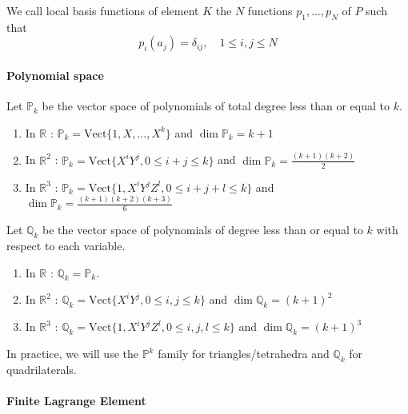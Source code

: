 \begin{Rem}
	We call local basis functions of element $K$ the $N$ functions $p_1,\dots,p_N$ of $P$ such that
	\begin{equation*}
		p_i(a_j)=\delta_{ij},\quad 1\le i,j\le N
	\end{equation*}
\end{Rem}

\paragraph{Polynomial space}

Let $\mathbb{P}_k$ be the vector space of polynomials of total degree less than or equal to $k$.

\begin{enumerate}[label=\textbullet]
	\item In $\mathbb{R}$ : $\mathbb{P}_k=\text{Vect}\{1,X,\dots,X^k\}$ and $\dim\mathbb{P}_k=k+1$ 
	\item In $\mathbb{R}^2$ : $\mathbb{P}_k=\text{Vect}\{X^iY^j,0\le i+j\le k\}$ and $\dim\mathbb{P}_k=\frac{(k+1)(k+2)}{2}$
	\item In $\mathbb{R}^3$ : $\mathbb{P}_k=\text{Vect}\{1,X^iY^jZ^l,0\le i+j+l\le k\}$ and $\dim\mathbb{P}_k=\frac{(k+1)(k+2)(k+3)}{6}$
\end{enumerate}

Let $\mathbb{Q}_k$ be the vector space of polynomials of degree less than or equal to $k$ with respect to each variable.

\begin{enumerate}[label=\textbullet]
	\item In $\mathbb{R}$ : $\mathbb{Q}_k=\mathbb{P}_k$. 
	\item In $\mathbb{R}^2$ : $\mathbb{Q}_k=\text{Vect}\{X^iY^j,0\le i,j\le k\}$ and $\dim\mathbb{Q}_k=(k+1)^2$
	\item In $\mathbb{R}^3$ : $\mathbb{Q}_k=\text{Vect}\{1,X^iY^jZ^l,0\le i,j,l\le k\}$ and $\dim\mathbb{Q}_k=(k+1)^3$
\end{enumerate}

\begin{Rem}
	In practice, we will use the $\mathbb{P}^k$ family for triangles/tetrahedra and $\mathbb{Q}_k$ for quadrilaterals.
\end{Rem}

\paragraph{Finite Lagrange Element}


